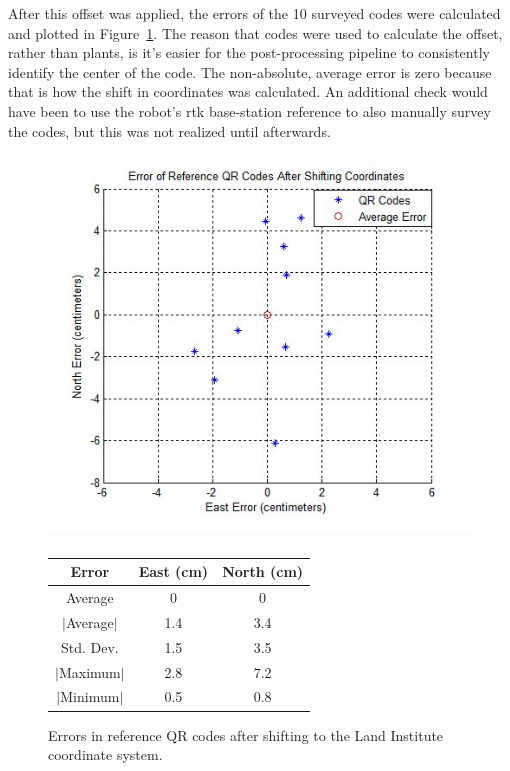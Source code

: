 After this offset was applied, the errors of the 10 surveyed codes were calculated and plotted in Figure~\ref{figure:code_errors}.  The reason that codes were used to calculate the offset, rather than plants, is it's easier for the post-processing pipeline to consistently identify the center of the code.  The non-absolute, average error is zero because that is how the shift in coordinates was calculated.  An additional check would have been to use the robot's \ac{rtk} base-station reference to also manually survey the codes, but this was not realized until afterwards.

  \begin{figure}
	\centering
    \includegraphics[height=4in]{figures/code_errors.jpg}
    \newline
    \newline
    \centering
    \begin{tabular}[c]{|c|c|c|}
       \hline
        Error & East (cm) & North (cm) \\ 
        \hline
        Average   & 0 & 0             \\
        $|$Average$|$ & 1.4 & 3.4       \\
        Std. Dev. & 1.5 & 3.5         \\
        $|$Maximum$|$   & 2.8 & 7.2       \\
        $|$Minimum$|$   & 0.5 & 0.8       \\
        \hline
    \end{tabular}
    \captionsetup{labelformat=andtable}
    \caption[Errors in reference QR codes]{Errors in reference QR codes after shifting to the Land Institute coordinate system.}
    \label{figure:code_errors}
  \end{figure}

